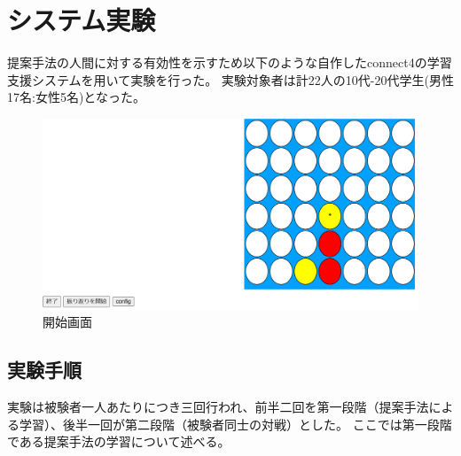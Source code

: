 \section{システム実験}
提案手法の人間に対する有効性を示すため以下のような自作したconnect4の学習支援システムを用いて実験を行った。
実験対象者は計22人の10代-20代学生(男性17名:女性5名)となった。
\begin{figure}[t]
	\centering
	\includegraphics[width=\linewidth]{./figure/basicSystem.png}
	\caption{開始画面}
	\label{fig:basic}
\end{figure}
\subsection{実験手順}
実験は被験者一人あたりにつき三回行われ、前半二回を第一段階（提案手法による学習）、後半一回が第二段階（被験者同士の対戦）とした。
ここでは第一段階である提案手法の学習について述べる。
\newpage
